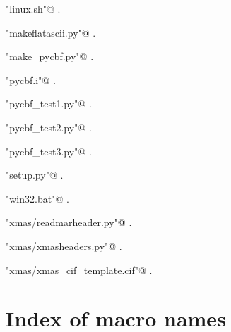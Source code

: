 \documentclass[10pt,a4paper,twoside,notitlepage]{article}
\begin{document}
{\small\begin{list}{}{\setlength{\itemsep}{-\parsep}\setlength{\itemindent}{-\leftmargin}}
\item \verb@"linux.sh"@ {\footnotesize {\NWtxtDefBy} .}
\item \verb@"makeflatascii.py"@ {\footnotesize {\NWtxtDefBy} .}
\item \verb@"make_pycbf.py"@ {\footnotesize {\NWtxtDefBy} .}
\item \verb@"pycbf.i"@ {\footnotesize {\NWtxtDefBy} .}
\item \verb@"pycbf_test1.py"@ {\footnotesize {\NWtxtDefBy} .}
\item \verb@"pycbf_test2.py"@ {\footnotesize {\NWtxtDefBy} .}
\item \verb@"pycbf_test3.py"@ {\footnotesize {\NWtxtDefBy} .}
\item \verb@"setup.py"@ {\footnotesize {\NWtxtDefBy} .}
\item \verb@"win32.bat"@ {\footnotesize {\NWtxtDefBy} .}
\item \verb@"xmas/readmarheader.py"@ {\footnotesize {\NWtxtDefBy} .}
\item \verb@"xmas/xmasheaders.py"@ {\footnotesize {\NWtxtDefBy} .}
\item \verb@"xmas/xmas_cif_template.cif"@ {\footnotesize {\NWtxtDefBy} .}
\end{list}}

\section*{Index of macro names}
\end{document}

